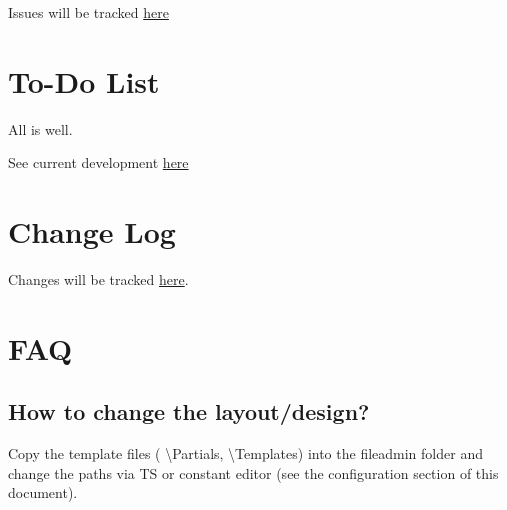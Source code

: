 \documentclass[a4paper,10pt,english]{sphinxmanual}
\begin{document}
Issues will be tracked \href{https://github.com/theorak/datec\_timeline}{here}


\chapter{To-Do List}
\label{ToDoList/Index:id1}\label{ToDoList/Index:to-do-list}\label{ToDoList/Index::doc}
All is well.

See current development \href{https://github.com/theorak/datec\_timeline}{here}


\chapter{Change Log}
\label{ChangeLog/Index:id1}\label{ChangeLog/Index::doc}\label{ChangeLog/Index:change-log}
Changes will be tracked \href{https://github.com/theorak/datec\_timeline}{here}.


\chapter{FAQ}
\label{FAQ/Index:id1}\label{FAQ/Index::doc}\label{FAQ/Index:faq}

\section{How to change the layout/design?}
\label{FAQ/Index:how-to-change-the-layout-design}
Copy the template files ( \textbackslash{}Partials, \textbackslash{}Templates)
into the fileadmin folder and change the paths via TS or constant editor (see the configuration section of this document).



\renewcommand{\indexname}{Index}
\printindex
\end{document}
